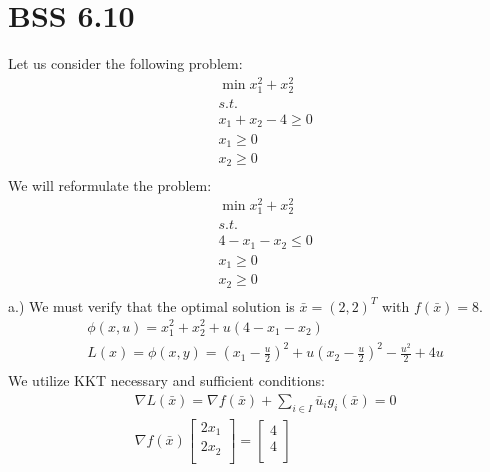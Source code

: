 \documentclass[12pt]{article}
\begin{document}
\section{BSS 6.10}
    Let us consider the following problem: \\
        \begin{align*}
            &\min x_1^2 + x_2^2\\
            &s.t.\\
            &x_1 + x_2 - 4 \geq 0\\
            &x_1 \geq 0\\
            &x_2 \geq 0 \\
        \end{align*}
    We will reformulate the problem:\\
        \begin{align*}
            &\min x_1^2 + x_2^2\\
            &s.t.\\
            &4-x_1-x_2 \leq 0\\
            &x_1 \geq 0\\
            &x_2 \geq 0 \\
        \end{align*}
    a.) We must verify that the optimal solution is $\bar x = (2,2)^T$ with $f(\bar x) = 8$. \\ 
        \begin{align*}
            &\phi (x,u) = x_1^2 + x_2^2 + u (4 - x_1 - x_2)\\
            &L(x) = \phi (x,y) = (x_1 - \frac{u}{2})^2 + u (x_2 - \frac{u}{2})^2 - \frac{u^2}{2} + 4u\\
        \end{align*}
    We utilize KKT necessary and sufficient conditions: \\
        \begin{align*}
            &\nabla L(\bar x) = \nabla f(\bar x) + \sum_{i \in I} \bar u_i g_i (\bar x) = 0\\ 
            &\nabla f(\bar x) 
                \begin{bmatrix}
                    2x_1\\
                    2x_2\\
                \end{bmatrix} = 
                \begin{bmatrix}
                    4\\
                    4\\
                \end{bmatrix}
        \end{align*}
        
\end{document}
